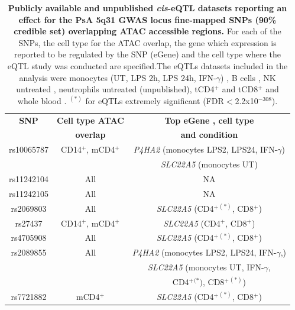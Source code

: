 \begin{table}[htbp]
\centering
\begin{tabular}{@{} c c c}
\toprule
\textbf{SNP} & \textbf{Cell type ATAC}   & \textbf{Top eGene , cell type } \\
             & \textbf{overlap}          & \textbf{and condition}  \\
\midrule
\midrule
rs10065787   & CD14$^+$, mCD4$^+$        & \textit{P4HA2} (monocytes LPS2, LPS24, IFN-$\gamma$) \\
             &                           &  \textit{SLC22A5} (monocytes UT) \\
rs11242104   & All                       &     NA        \\ 
rs11242105   & All                       &     NA   \\
rs2069803    & All                       & \textit{SLC22A5} (CD4$^+$$^{(\ast)}$, CD8$^+$) \\   
rs27437      & CD14$^+$, mCD4$^+$        & \textit{SLC22A5} (CD4$^+$, CD8$^+$) \\ 
rs4705908    & All                       & \textit{SLC22A5} (CD4$^+$$^{(\ast)}$, CD8$^+$) \\
rs2089855    & All                  & \textit{P4HA2} (monocytes LPS2, LPS24, IFN-$\gamma$,) \\
             &                           & \textit{SLC22A5} (monocytes UT, IFN-$\gamma$,\\
						 &                           & CD4$^+$$^{(\ast})$, CD8$^+$$^{(\ast)}$)  \\
rs7721882    & mCD4$^+$                  & \textit{SLC22A5} (CD4$^+$$^{(\ast)}$, CD8$^+$) \\									
\bottomrule
\end{tabular}
\medskip %
\caption[Publicly available \textit{cis}-eQTL datasets reporting an effect for the PsA 5q31 GWAS locus fine-mapped SNPs (90\% credible set) overlapping ATAC accessible regions.]{\textbf{Publicly available and unpublished \textit{cis}-eQTL datasets reporting an effect for the PsA 5q31 GWAS locus fine-mapped SNPs (90\% credible set) overlapping ATAC accessible regions.} For each of the SNPs, the cell type for the ATAC overlap, the gene which expression is reported to be regulated by the SNP (eGene) and the cell type where the eQTL study was conducted are specified.The eQTLs datasets included in the analysis were monocytes (UT, LPS 2h, LPS 24h, IFN-$\gamma$) \parencite{Fairfax2014}, B cells \parencite{Fairfax2012}, NK untreated \parencite{Naranbhai2015}, neutrophils untreated (unpublished), tCD4$^+$ and tCD8$^+$ \parencite{Kasela2017} and whole blood \parencite{Jansen2017}. $^{(\ast)}$ for eQTLs extremely significant (FDR$<$2.2x10$^{-308}$).}
\label{tab:5q31_SNPs_ATAC_eQTL}
\end{table}

